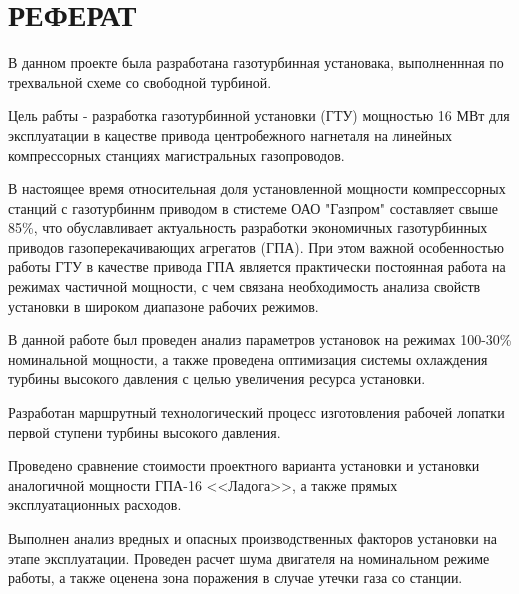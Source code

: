 \section*{РЕФЕРАТ}
В данном проекте была разработана газотурбинная установака, выполненнная
по трехвальной схеме со свободной турбиной.

Цель рабты - разработка газотурбинной установки (ГТУ) мощностью 16 МВт для 
эксплуатации в кацестве привода центробежного нагнеталя на линейных 
компрессорных станциях магистральных газопроводов.

В настоящее время относительная доля установленной мощности компрессорных станций с газотурбиннм приводом в стистеме ОАО "Газпром" составляет свыше 85\%, что обуславливает актуальность разработки экономичных газотурбинных приводов газоперекачивающих агрегатов (ГПА). При этом важной особенностью работы ГТУ в качестве привода ГПА является практически постоянная работа на режимах частичной мощности, с чем связана необходимость анализа свойств установки в широком диапазоне рабочих режимов.

В данной работе был проведен анализ параметров установок на режимах 100-30\% номинальной мощности, а также проведена оптимизация системы охлаждения турбины высокого давления с целью увеличения ресурса установки.

Разработан маршрутный технологический процесс изготовления рабочей лопатки первой ступени турбины высокого давления.

Проведено сравнение стоимости проектного варианта установки и установки аналогичной мощности ГПА-16 <<Ладога>>, а также прямых эксплуатационных расходов.

Выполнен анализ вредных и опасных производственных факторов установки на этапе эксплуатации. Проведен расчет шума двигателя на номинальном режиме работы, а также оценена зона поражения в случае утечки газа со станции.
